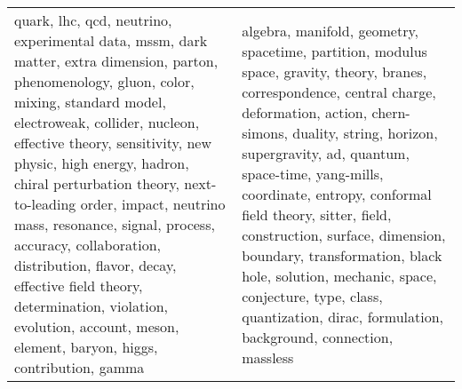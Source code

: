 \begin{longtable}{p{7cm}|p{7cm}}
\bottomrule
\endlastfoot
quark, lhc, qcd, neutrino, experimental data, mssm, dark matter, extra dimension, parton, phenomenology, gluon, color, mixing, standard model, electroweak, collider, nucleon, effective theory, sensitivity, new physic, high energy, hadron, chiral perturbation theory, next-to-leading order, impact, neutrino mass, resonance, signal, process, accuracy, collaboration, distribution, flavor, decay, effective field theory, determination, violation, evolution, account, meson, element, baryon, higgs, contribution, gamma & algebra, manifold, geometry, spacetime, partition, modulus space, gravity, theory, branes, correspondence, central charge, deformation, action, chern-simons, duality, string, horizon, supergravity, ad, quantum, space-time, yang-mills, coordinate, entropy, conformal field theory, sitter, field, construction, surface, dimension, boundary, transformation, black hole, solution, mechanic, space, conjecture, type, class, quantization, dirac, formulation, background, connection, massless \\
\end{longtable}
